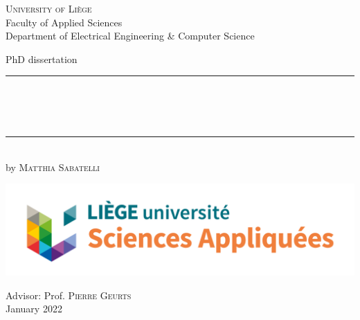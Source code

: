 
\begin{titlepage}
	\begin{addmargin}[-1cm]{-3cm}
    \begin{center}
        \large
        {\Large \textsc{University of Li{\`e}ge}}\\[1ex]
        Faculty of Applied Sciences\\
        Department of Electrical Engineering \& Computer Science\\

        \vfill

        PhD dissertation\\ \vskip1cm
        \rule{14cm}{0.4pt}\\ \bigskip
        \begingroup
            \Large
            \color{Maroon}\spacedallcaps{\myTitle} \\ \bigskip
        \endgroup
        \spacedlowsmallcaps{\mySubtitle} \\ \bigskip
        \rule{14cm}{0.4pt}\\ \vskip1cm
        by \textsc{Matthia Sabatelli}

        \vfill

	\includegraphics[width=1\textwidth]{Images/new_logo}

        \vfill

        \hfill Advisor: Prof. \textsc{Pierre Geurts}\\
        \hfill January 2022
    \end{center}
  \end{addmargin}
\end{titlepage}
